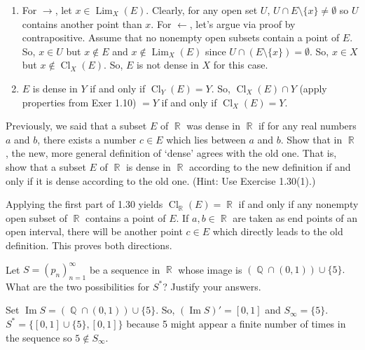 \documentclass[12pt,letterpaper,boxed]{hmcpset}
\DeclareMathOperator{\Lim}{Lim}
\DeclareMathOperator{\Img}{Im}
\DeclareMathOperator{\Cl}{Cl}
\DeclareMathOperator{\R}{\mathbb{R}}
\DeclareMathOperator{\Q}{\mathbb{Q}}
\begin{document}
\begin{solution}
\vspace{-2mm}
	\begin{enumerate}
		\itemsep0em
		\item For $\rightarrow$, let $x \in \Lim_X(E).$ Clearly, for any open set $U$, $U \cap E\setminus\{x\}\neq \emptyset$ so $U$ contains another point than $x$. For $\leftarrow$, let's argue via proof by contrapositive. Assume that no nonempty open subsets contain a point of $E$. So, $x\in U$ but $x \notin E$ and $x\notin \Lim_X(E)$ since $U\cap (E\setminus \{x\})=\emptyset.$ So, $x \in X$ but $x \notin \Cl_X(E).$ So, $E$ is not dense in $X$ for this case.
		\item $E$ is dense in $Y$ if and only if $\Cl_Y(E)= Y.$ So, $\Cl_X(E)\cap Y$ (apply properties from Exer 1.10) $ = Y$ if and only if $\Cl_X(E) = Y.$ 
	\end{enumerate}
\end{solution}

\begin{problem}[Exercise 1.31]
Previously, we said that a subset $E$ of $\R$ was dense in $\R$ if for any real numbers $a$
and $b$, there exists a number $c\in E$ which lies between $a$ and $b$. Show that in $\R$, the new, more general definition of ‘dense’ agrees with the old one. That is, show that a subset $E$ of $\R$ is dense in $\R$ according
to the new definition if and only if it is dense according to the old one. (Hint: Use Exercise 1.30(1).)
\end{problem}

\begin{solution}
Applying the first part of 1.30 yields $\Cl_{\R}(E)=\R$ if and only if any nonempty open subset of $\R$ contains a point of $E$. If $a,b \in \R$ are taken as end points of an open interval, there will be another point $c\in E$ which directly leads to the old definition. This proves both directions.
\end{solution}


\begin{problem}[Exercise 2.7]
Let $S = (p_n)_{n=1}^{\infty}$ be a sequence in $\R$ whose image is $(\Q\cap (0,1))\cup \{5\}.$ What are the two possibilities for $S^{*}$? Justify your answers.
\end{problem}

\begin{solution}
Set $\Img S = (\Q\cap (0,1))\cup\{5\}$. So, $(\Img S)' = [0, 1]$ and $S_{\infty}=\{ 5\}$. $S^{*}=\{[0,1]\cup \{5\}, [0,1]\}$ because 5 might appear a finite number of times in the sequence so  $5 \notin S_{\infty}.$
\end{solution}
\end{document}
